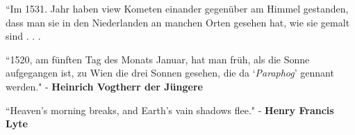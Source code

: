 \documentclass[11pt]{article}
\begin{document}
\begingroup
\begin{center}
``Im 1531. Jahr haben view Kometen einander gegenüber am Himmel gestanden, dass man sie in den Niederlanden an manchen Orten gesehen hat, wie sie gemalt sind . . . 
\rightskip\leftskip
\phantom{text} \hfill \textcolor{white}{fuck}
\end{center}
\endgroup

\begingroup
\begin{center}
``1520, am fünften Tag des Monats Januar, hat man früh, als die Sonne aufgegangen ist, zu Wien die drei Sonnen gesehen, die da `\textit{Paraphog}' gennant werden."
\rightskip\leftskip
\phantom{text} \hfill - \textbf{Heinrich Vogtherr der Jüngere}
\end{center}
\endgroup

\vspace*{0.1\baselineskip}

\begingroup
\begin{center}
``Heaven's morning breaks, and Earth's vain shadows flee."
\rightskip\leftskip
\phantom{text} \hfill - \textbf{Henry Francis Lyte}
\end{center}
\endgroup
\end{document}
